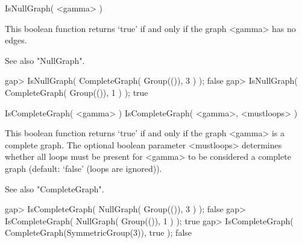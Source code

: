 
\>IsNullGraph( <gamma> )

This boolean function returns `true' if and only if the graph <gamma> has
no edges.

See also "NullGraph".

\beginexample
gap> IsNullGraph( CompleteGraph( Group(()), 3 ) );
false
gap> IsNullGraph( CompleteGraph( Group(()), 1 ) );
true 
\endexample


\>IsCompleteGraph( <gamma> )
\>IsCompleteGraph( <gamma>, <mustloops> )

This boolean function returns  `true' if and only if the graph <gamma> is
a complete graph.  The optional boolean  parameter <mustloops> determines
whether all loops must be present for <gamma> to be considered a complete
graph (default: `false' (loops are ignored)).

See also "CompleteGraph".

\beginexample
gap> IsCompleteGraph( NullGraph( Group(()), 3 ) );
false
gap> IsCompleteGraph( NullGraph( Group(()), 1 ) );
true
gap> IsCompleteGraph( CompleteGraph(SymmetricGroup(3)), true );
false 
\endexample
